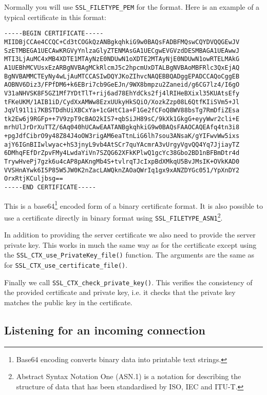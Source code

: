 Normally you will use \verb!SSL_FILETYPE_PEM! for the format. Here is an 
example of a typical certificate in this format:

\begin{verbatim}
-----BEGIN CERTIFICATE-----
MIIDBjCCAe4CCQC+Cd3tCOGkQzANBgkqhkiG9w0BAQsFADBFMQswCQYDVQQGEwJV
SzETMBEGA1UECAwKRGVyYnlzaGlyZTENMAsGA1UECgwEVGVzdDESMBAGA1UEAwwJ
MTI3LjAuMC4xMB4XDTE1MTAyNzE0NDUwN1oXDTE2MTAyNjE0NDUwN1owRTELMAkG
A1UEBhMCVUsxEzARBgNVBAgMCkRlcmJ5c2hpcmUxDTALBgNVBAoMBFRlc3QxEjAQ
BgNVBAMMCTEyNy4wLjAuMTCCASIwDQYJKoZIhvcNAQEBBQADggEPADCCAQoCggEB
AOBNV6Diz3/FPfDM6+k6EBri7cb9GeEJn/9WX8bmpzu2Zaneid/g6CG7lz4/I6gO
V31aNHVSK8F5GZ1Mf7YDtTlT+rij6ad78EhYdCks2fj4lRIHeBXixl35KUAtsEfy
tFKeUKM/1AIB1iD/CydXxAMWw8EzxUUkyHkSQiO/XozkZzp08L6QtfKIiSVm5+Jl
JqVl91l1i7KBSTDdhUiXBCxYa+1cGHtC1a+F1Ge2fCFoQ8WV88bsTg7RmDfiZEsa
tk2Ew6j9RGFp++7V9zpT9cBAO2kIS7+qbSiJH89sC/9kXk1GkgG+eyyWwr2cli+E
mrhUlJrDrXuTTZ/6Aq040hUCAwEAATANBgkqhkiG9w0BAQsFAAOCAQEAfq4tn3i8
+pgJdfCibrO9y48Z84J4oOW3rigAM6eaTtnLiG6lh7sou3ANsaK/gYIFwvWw5ixs
ajY6IGnBIIwlwyac+hS3jnyL9vb4AtSCr7quYAcmrA3vUrgyVgvQQ4Yq7JjiayTZ
6DMhqFEfDrZpvFMy4LwdaYiVn7SZQG62XFkKPlwQ1gcYc38Gbo2BD1nBFBmDtr4d
TrywHvePj7gzk6u4cAP8pAKngMb4S+tvlrqTJcIxpBdXMkqU5BvJMsIK+OVkKAD0
VVSHnAYwk6I5P85W5JW0K2nZacLAWQknZAOaQWrIq1gx9xANZDYGc051/YpXnDY2
OrxRtjKCuljbsg==
-----END CERTIFICATE-----
\end{verbatim}

This is a base64\footnote{Base64 encoding converts binary data into printable 
text strings.} encoded form of a binary certificate format. It is also 
possible to use a certificate directly in binary format using 
\verb!SSL_FILETYPE_ASN1!\footnote{Abstract Syntax Notation One (ASN.1) is a 
notation for describing the structure of data that has been standardised by 
ISO, IEC and ITU-T.}.

In addition to providing the server certificate we also need to provide the 
server private key. This works in much the same way as for the certificate 
except using the \verb!SSL_CTX_use_PrivateKey_file()! function. The arguments 
are the same as for \verb!SSL_CTX_use_certificate_file()!.

Finally we call \verb!SSL_CTX_check_private_key()!. This verifies the 
consistency of the provided certificate and private key, i.e. it checks that 
the private key matches the public key in the certificate.

\subsection{Listening for an incoming connection}

